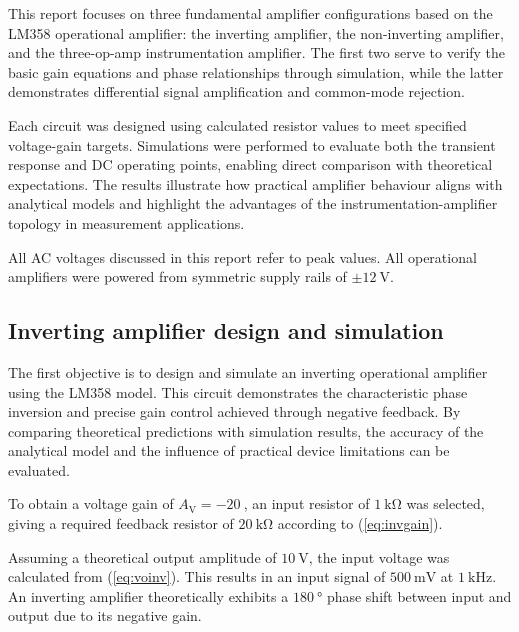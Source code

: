 \documentclass[conference]{IEEEtran}
\newcommand{\Ax}[1]{A_\mathrm{#1}}
\begin{document}
This report focuses on three fundamental amplifier configurations based on the LM358 operational amplifier: the inverting amplifier, the non-inverting amplifier, and the three-op-amp instrumentation amplifier.  
The first two serve to verify the basic gain equations and phase relationships through simulation, while the latter demonstrates differential signal amplification and common-mode rejection.  

Each circuit was designed using calculated resistor values to meet specified voltage-gain targets.  
Simulations were performed to evaluate both the transient response and DC operating points, enabling direct comparison with theoretical expectations.  
The results illustrate how practical amplifier behaviour aligns with analytical models and highlight the advantages of the instrumentation-amplifier topology in measurement applications.

All AC voltages discussed in this report refer to peak values.  
All operational amplifiers were powered from symmetric supply rails of \(\pm\qty{12}{\volt}\).



\subsection{Inverting amplifier design and simulation}

The first objective is to design and simulate an inverting operational amplifier using the LM358 model.  
This circuit demonstrates the characteristic phase inversion and precise gain control achieved through negative feedback.  
By comparing theoretical predictions with simulation results, the accuracy of the analytical model and the influence of practical device limitations can be evaluated.

To obtain a voltage gain of \(\Ax{V}=\qty{-20}{}\), an input resistor of \(\qty{1}{\kilo\ohm}\) was selected, giving a required feedback resistor of \(\qty{20}{\kilo\ohm}\) according to (\ref{eq:invgain}).  

Assuming a theoretical output amplitude of \(\qty{10}{\volt}\), the input voltage was calculated from (\ref{eq:voinv}).  
This results in an input signal of \(\qty{500}{\milli\volt}\) at \(\qty{1}{\kilo\hertz}\).  
An inverting amplifier theoretically exhibits a \(\qty{180}{\degree}\) phase shift between input and output due to its negative gain.
\end{document}
